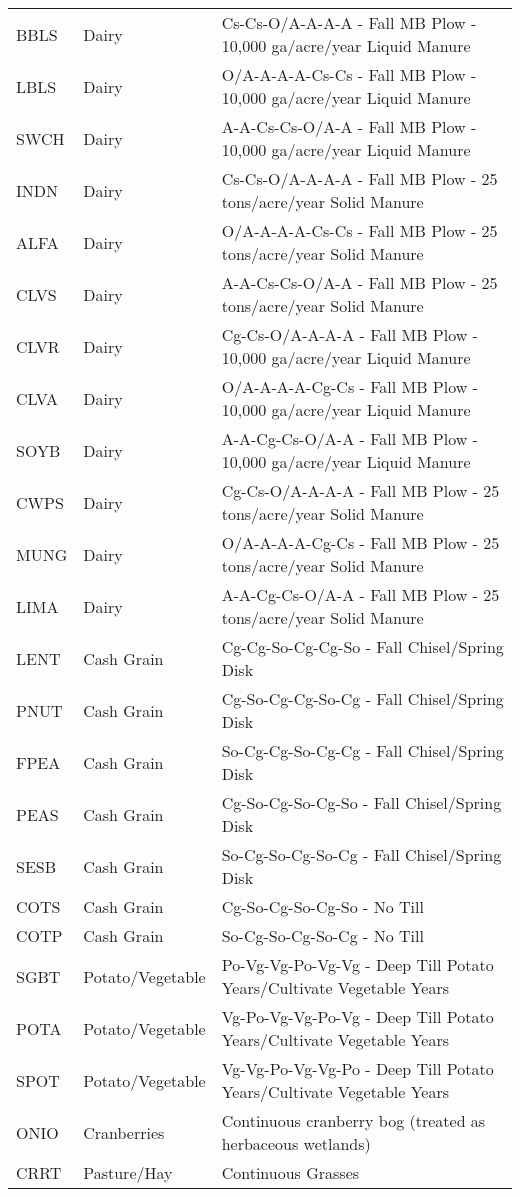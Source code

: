 \begin{landscape}
\begin{longtable}{l l l}
  BBLS & Dairy & Cs-Cs-O/A-A-A-A - Fall MB Plow - 10,000 ga/acre/year Liquid Manure \\ 
  LBLS & Dairy & O/A-A-A-A-Cs-Cs - Fall MB Plow - 10,000 ga/acre/year Liquid Manure \\ 
  SWCH & Dairy & A-A-Cs-Cs-O/A-A - Fall MB Plow - 10,000 ga/acre/year Liquid Manure \\ 
  INDN & Dairy & Cs-Cs-O/A-A-A-A - Fall MB Plow - 25 tons/acre/year Solid Manure \\ 
  ALFA & Dairy & O/A-A-A-A-Cs-Cs - Fall MB Plow - 25 tons/acre/year Solid Manure \\ 
  CLVS & Dairy & A-A-Cs-Cs-O/A-A - Fall MB Plow - 25 tons/acre/year Solid Manure \\ 
  CLVR & Dairy & Cg-Cs-O/A-A-A-A - Fall MB Plow - 10,000 ga/acre/year Liquid Manure \\ 
  CLVA & Dairy & O/A-A-A-A-Cg-Cs - Fall MB Plow - 10,000 ga/acre/year Liquid Manure \\ 
  SOYB & Dairy & A-A-Cg-Cs-O/A-A - Fall MB Plow - 10,000 ga/acre/year Liquid Manure \\ 
  CWPS & Dairy & Cg-Cs-O/A-A-A-A - Fall MB Plow - 25 tons/acre/year Solid Manure \\ 
  MUNG & Dairy & O/A-A-A-A-Cg-Cs - Fall MB Plow - 25 tons/acre/year Solid Manure \\ 
  LIMA & Dairy & A-A-Cg-Cs-O/A-A - Fall MB Plow - 25 tons/acre/year Solid Manure \\
  LENT & Cash Grain & Cg-Cg-So-Cg-Cg-So - Fall Chisel/Spring Disk \\ 
  PNUT & Cash Grain & Cg-So-Cg-Cg-So-Cg - Fall Chisel/Spring Disk \\ 
  FPEA & Cash Grain & So-Cg-Cg-So-Cg-Cg - Fall Chisel/Spring Disk \\ 
  PEAS & Cash Grain & Cg-So-Cg-So-Cg-So - Fall Chisel/Spring Disk \\ 
  SESB & Cash Grain & So-Cg-So-Cg-So-Cg - Fall Chisel/Spring Disk \\ 
  COTS & Cash Grain & Cg-So-Cg-So-Cg-So - No Till \\ 
  COTP & Cash Grain & So-Cg-So-Cg-So-Cg - No Till \\ 
  SGBT & Potato/Vegetable & Po-Vg-Vg-Po-Vg-Vg - Deep Till Potato Years/Cultivate Vegetable Years \\ 
  POTA & Potato/Vegetable & Vg-Po-Vg-Vg-Po-Vg - Deep Till Potato Years/Cultivate Vegetable Years \\ 
  SPOT & Potato/Vegetable & Vg-Vg-Po-Vg-Vg-Po - Deep Till Potato Years/Cultivate Vegetable Years \\
  ONIO & Cranberries      & Continuous cranberry bog (treated as herbaceous wetlands) \\ 
  CRRT & Pasture/Hay & Continuous Grasses
\label{tab:lnd_mgt_def}
\end{longtable}
\end{landscape}
